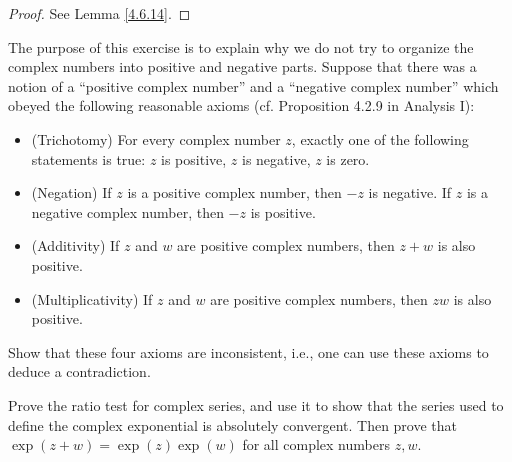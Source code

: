 \begin{proof}
    See Lemma \ref{4.6.14}.
\end{proof}

\begin{exercise}\label{ex 4.6.15}
    The purpose of this exercise is to explain why we do not try to organize the complex numbers into positive and negative parts.
    Suppose that there was a notion of a ``positive complex number'' and a ``negative complex number'' which obeyed the following reasonable axioms (cf. Proposition 4.2.9 in Analysis I):
    \begin{itemize}
        \item (Trichotomy)
              For every complex number \(z\), exactly one of the following statements is true:
              \(z\) is positive, \(z\) is negative, \(z\) is zero.
        \item (Negation)
              If \(z\) is a positive complex number, then \(-z\) is negative.
              If \(z\) is a negative complex number, then \(-z\) is positive.
        \item (Additivity)
              If \(z\) and \(w\) are positive complex numbers, then \(z + w\) is also positive.
        \item (Multiplicativity)
              If \(z\) and \(w\) are positive complex numbers, then \(zw\) is also positive.
    \end{itemize}
    Show that these four axioms are inconsistent, i.e., one can use these axioms to deduce a contradiction.
\end{exercise}

\begin{exercise}\label{ex 4.6.16}
    Prove the ratio test for complex series, and use it to show that the series used to define the complex exponential is absolutely convergent.
    Then prove that \(\exp(z + w) = \exp(z) \exp(w)\) for all complex numbers \(z, w\).
\end{exercise}